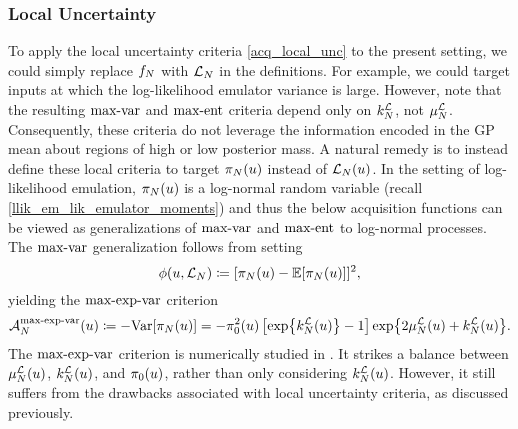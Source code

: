 \documentclass[12pt]{article}
\begin{document}
\subsubsection{Local Uncertainty}
To apply the local uncertainty criteria \ref{acq_local_unc} to the present setting, we could simply replace 
$\funcEm$ with $\llikEm$ in the definitions. For example, we could target inputs at which the log-likelihood 
emulator variance is large. However, note that the resulting $\maxvarLabel$ and 
$\maxentLabel$ criteria depend only on $\emKer[\Ndesign]{\llik}$, not $\emMean[\Ndesign]{\llik}$.
Consequently, these criteria do not leverage the information encoded in the GP mean about 
regions of high or low posterior mass. A natural remedy is to instead define these local criteria to 
target $\llikEmRdmDens[\Ndesign](\Par)$ instead of $\llikEm(\Par)$. In the setting of log-likelihood 
emulation, $\llikEmRdmDens[\Ndesign](\Par)$ is a log-normal random variable 
(recall \ref{llik_em_lik_emulator_moments}) and thus the below acquisition functions can be viewed 
as generalizations of $\maxvarLabel$ and $\maxentLabel$ to log-normal processes. The 
$\maxvarLabel$ generalization follows from setting 
\begin{equation}
\qoiMap(\Par, \llikEm) \Def [\llikEmRdmDens[\Ndesign](\Par) - \E[\llikEmRdmDens[\Ndesign](\Par)]]^2, \label{qoi_exp_var}
\end{equation}
yielding the $\maxexpvarLabel$ criterion
\begin{equation}
\labelAcq[\Ndesign]{\maxexpvarLabel}(\Par) \Def -\Var[\llikEmRdmDens[\Ndesign](\Par)]  
=  -\priorDens^2(\Par) \left[\Exp{\emKer[\Ndesign]{\llik}(\Par)} - 1 \right] \Exp{2\emMean[\Ndesign]{\llik}(\Par) + \emKer[\Ndesign]{\llik}(\Par)}.
\label{acq_max_exp_var}
\end{equation}
The $\maxexpvarLabel$ criterion is numerically studied in \cite{KandasamyActiveLearning2015, Kandasamy_2017}.
It strikes a balance between $\emMean[\Ndesign]{\llik}(\Par)$, $\emKer[\Ndesign]{\llik}(\Par)$, and $\priorDens(\Par)$, 
rather than only considering $\emKer[\Ndesign]{\llik}(\Par)$. However, it still suffers from the drawbacks associated with
 local uncertainty criteria, as discussed previously. 
 
\end{document}
